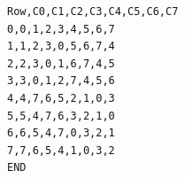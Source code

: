 \begin{verbatim}
Row,C0,C1,C2,C3,C4,C5,C6,C7
0,0,1,2,3,4,5,6,7
1,1,2,3,0,5,6,7,4
2,2,3,0,1,6,7,4,5
3,3,0,1,2,7,4,5,6
4,4,7,6,5,2,1,0,3
5,5,4,7,6,3,2,1,0
6,6,5,4,7,0,3,2,1
7,7,6,5,4,1,0,3,2
END
\end{verbatim}
